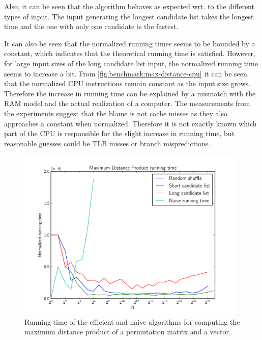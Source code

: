 \documentclass[twoside,11pt,openright]{report}
\begin{document}
Also, it can be seen that the algorithm behaves as expected wrt. to the different types of input. The input generating the longest candidate list takes the longest time and the one with only one candidate is the fastest.

It can also be seen that the normalized running times seems to be bounded by a constant, which indicates that the theoretical running time is satisfied. However, for large input sizes of the long candidate list input, the normalized running time seems to increase a bit. From \cref{fig:benchmark:max-distance-cpu} it can be seen that the normalized CPU instructions remain constant as the input size grows. Therefore the increase in running time can be explained by a mismatch with the RAM model and the actual realization of a computer. The measurements from the experiments suggest that the blame is not cache misses as they also approaches a constant when normalized. Therefore it is not exactly known which part of the CPU is responsible for the slight increase in running time, but reasonable guesses could be TLB misses or branch mispredictions.

\begin{figure}[h!]
  \centering
  \includegraphics[width=11cm]{distance-mult/max-dist-mult}
  \caption{Running time of the efficient and naive algorithms for computing the maximum distance product of a permutation matrix and a vector.}
  \label{fig:benchmark:max-distance}
\end{figure}
\end{document}
